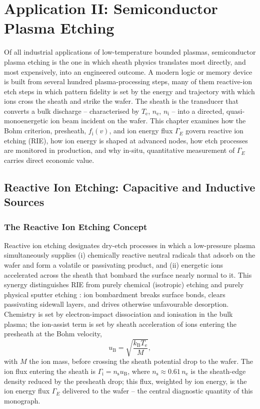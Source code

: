\chapter{Application II: Semiconductor Plasma Etching}
\label{ch:etch}

Of all industrial applications of low-temperature bounded plasmas, semiconductor plasma etching is the one in which sheath physics translates most directly, and most expensively, into an engineered outcome. A modern logic or memory device is built from several hundred plasma-processing steps, many of them reactive-ion etch steps in which pattern fidelity is set by the energy and trajectory with which ions cross the sheath and strike the wafer. The sheath is the transducer that converts a bulk discharge -- characterised by $T_{\mathrm{e}}$, $n_{\mathrm{e}}$, $n_{\mathrm{i}}$ -- into a directed, quasi-monoenergetic ion beam incident on the wafer. This chapter examines how the Bohm criterion, presheath, $f_{\mathrm{i}}(v)$, and ion energy flux $\Gamma_{E}$ govern reactive ion etching (RIE), how ion energy is shaped at advanced nodes, how etch processes are monitored in production, and why in-situ, quantitative measurement of $\Gamma_E$ carries direct economic value.

\section{Reactive Ion Etching: Capacitive and Inductive Sources}

\subsection{The Reactive Ion Etching Concept}

Reactive ion etching designates dry-etch processes in which a low-pressure plasma simultaneously supplies (i) chemically reactive neutral radicals that adsorb on the wafer and form a volatile or passivating product, and (ii) energetic ions accelerated across the sheath that bombard the surface nearly normal to it. This synergy distinguishes RIE from purely chemical (isotropic) etching and purely physical sputter etching \cite{ref0536}: ion bombardment breaks surface bonds, clears passivating sidewall layers, and drives otherwise unfavourable desorption. Chemistry is set by electron-impact dissociation and ionisation in the bulk plasma; the ion-assist term is set by sheath acceleration of ions entering the presheath at the Bohm velocity,
\begin{equation}
u_{\mathrm{B}} = \sqrt{\frac{k_{\mathrm{B}} T_{\mathrm{e}}}{M}},
\label{eq:etch_bohm}
\end{equation}
with $M$ the ion mass, before crossing the sheath potential drop to the wafer. The ion flux entering the sheath is $\Gamma_{\mathrm{i}} = n_{\mathrm{s}} u_{\mathrm{B}}$, where $n_{\mathrm{s}} \approx 0.61\, n_{\mathrm{e}}$ is the sheath-edge density reduced by the presheath drop; this flux, weighted by ion energy, is the ion energy flux $\Gamma_{E}$ delivered to the wafer -- the central diagnostic quantity of this monograph.

